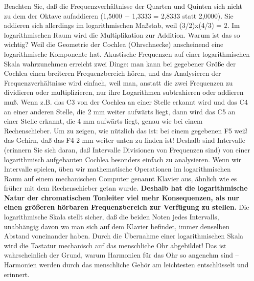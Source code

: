 Beachten Sie, daß die Frequenzverhältnisse der Quarten und Quinten sich nicht zu dem der Oktave aufaddieren (1,5000 + 1,3333 = 2,8333 statt 2,0000).
Sie addieren sich allerdings im logarithmischen Maßstab, weil (3/2)x(4/3) = 2.
Im logarithmischen Raum wird die Multiplikation zur Addition.
Warum ist das so wichtig?
Weil die Geometrie der Cochlea (Ohrschnecke) anscheinend eine logarithmische Komponente hat.
Akustische Frequenzen auf einer logarithmischen Skala wahrzunehmen erreicht zwei Dinge: man kann bei gegebener Größe der Cochlea einen breiteren Frequenzbereich hören, und das Analysieren der Frequenzverhältnisse wird einfach, weil man, anstatt die zwei Frequenzen zu dividieren oder multiplizieren, nur ihre Logarithmen subtrahieren oder addieren muß.
Wenn z.B. das C3 von der Cochlea an einer Stelle erkannt wird und das C4 an einer anderen Stelle, die 2 mm weiter aufwärts liegt, dann wird das C5 an einer Stelle erkannt, die 4 mm aufwärts liegt, genau wie bei einem Rechenschieber.
Um zu zeigen, wie nützlich das ist: bei einem gegebenen F5 weiß das Gehirn, daß das F4 2 mm weiter unten zu finden ist!
Deshalb sind Intervalle (erinnern Sie sich daran, daß Intervalle Divisionen von Frequenzen sind) von einer logarithmisch aufgebauten Cochlea besonders einfach zu analysieren.
Wenn wir Intervalle spielen, üben wir mathematische Operationen im logarithmischen Raum auf einem mechanischen Computer genannt Klavier aus, ähnlich wie es früher mit dem Rechenschieber getan wurde.
\textbf{Deshalb hat die logarithmische Natur der chromatischen Tonleiter viel mehr Konsequenzen, als nur einen größeren hörbaren Frequenzbereich zur Verfügung zu stellen.}
Die logarithmische Skala stellt sicher, daß die beiden Noten jedes Intervalls, unabhängig davon wo man sich auf dem Klavier befindet, immer denselben Abstand voneinander haben.
Durch die Übernahme einer logarithmischen Skala wird die Tastatur mechanisch auf das menschliche Ohr abgebildet!
Das ist wahrscheinlich der Grund, warum Harmonien für das Ohr so angenehm sind -- Harmonien werden durch das menschliche Gehör am leichtesten entschlüsselt und erinnert.

